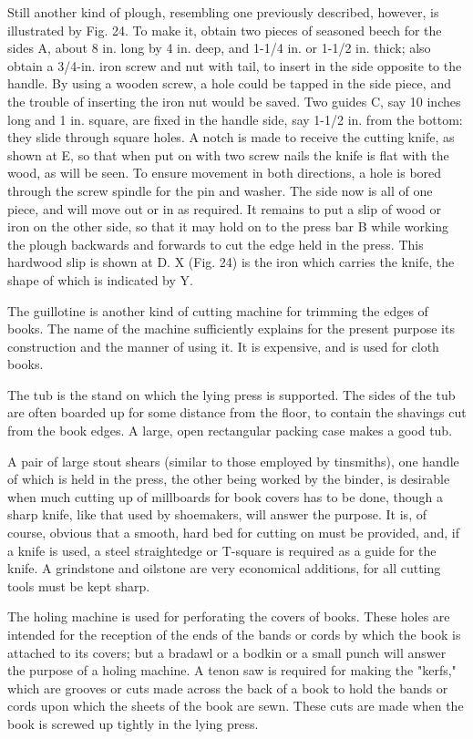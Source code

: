 \documentclass[twoside]{book}
\begin{document}
Still another kind of plough, resembling one
previously described, however, is illustrated by Fig.
24. To make it, obtain two pieces of seasoned beech
for the sides A, about 8 in. long by 4 in. deep, and
1-1/4 in. or 1-1/2 in. thick; also obtain a 3/4-in. iron
screw and nut with tail, to insert in the side
\pagebreak
opposite to the handle. By using a wooden screw,
a hole could be tapped in the side piece, and the
trouble of inserting the iron nut would be saved.
Two guides C, say 10 inches long and 1 in. square,
are fixed in the handle side, say 1-1/2 in. from the
bottom: they slide through square holes. A notch
is made to receive the cutting knife, as shown at E,
so that when put on with two screw nails the knife
is flat with the wood, as will be seen. To ensure
movement in both directions, a hole is bored
through the screw spindle for the pin and washer.
The side now is all of one piece, and will move
out or in as required. It remains to put a slip of
wood or iron on the other side, so that it may hold
on to the press bar B while working the plough
backwards and forwards to cut the edge held in the
press. This hardwood slip is shown at D. X (Fig.
24) is the iron which carries the knife, the shape of
which is indicated by Y.

The guillotine is another kind of cutting machine
for trimming the edges of books. The name of the
machine sufficiently explains for the present purpose
its construction and the manner of using it. It is
expensive, and is used for cloth books.

The tub is the stand on which the lying press is
supported. The sides of the tub are often boarded
up for some distance from the floor, to contain the
shavings cut from the book edges. A large, open
rectangular packing case makes a good tub.

A pair of large stout shears (similar to those
employed by tinsmiths), one handle of which is held in
the press, the other being worked by the binder,
is desirable when much cutting up of millboards for
book covers has to be done, though a sharp knife,
like that used by shoemakers, will answer the purpose.
It is, of course, obvious that a smooth, hard
bed for cutting on must be provided, and, if a
knife is used, a steel straightedge or T-square is
required as a guide for the knife. A grindstone
\pagebreak
and oilstone are very economical additions, for all
cutting tools must be kept sharp.

The holing machine is used for perforating the
covers of books. These holes are intended for the
reception of the ends of the bands or cords by which
the book is attached to its covers; but a bradawl
or a bodkin or a small punch will answer the purpose
of a holing machine. A tenon saw is required
for making the "kerfs," which are grooves or cuts
made across the back of a book to hold the bands
or cords upon which the sheets of the book are
sewn. These cuts are made when the book is
screwed up tightly in the lying press.
\end{document}
